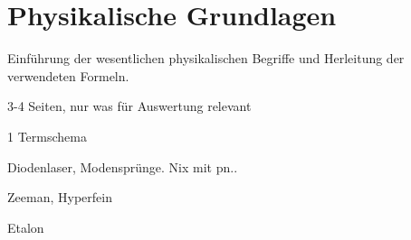 \section{Physikalische Grundlagen}
Einführung der wesentlichen physikalischen Begriffe und Herleitung der verwendeten Formeln.

3-4 Seiten, nur was für Auswertung relevant

1 Termschema

Diodenlaser, Modensprünge. Nix mit pn..

Zeeman, Hyperfein

Etalon